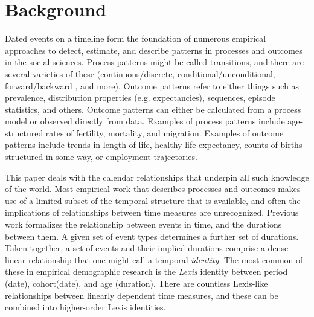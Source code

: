 
\section{Background}
Dated events on a timeline form the foundation of numerous empirical approaches to detect, estimate, and describe patterns in processes and outcomes in the social sciences. Process patterns might be called transitions, and there are several varieties of these (continuous/discrete, conditional/unconditional, forward/backward \citep{brouard2019backward}, and more). Outcome patterns refer to either things such as prevalence, distribution properties (e.g. expectancies), sequences, episode statistics, and others. Outcome patterns can either be calculated from a process model or observed directly from data. Examples of process patterns include age-structured rates of fertility, mortality, and migration. Examples of outcome patterns include trends in length of life, healthy life expectancy, counts of births structured in some way, or employment trajectories. 

This paper deals with the calendar relationships that underpin all such knowledge of the world. Most empirical work that describes processes and outcomes makes use of a limited subset of the temporal structure that is available, and often the implications of relationships between time measures are unrecognized. Previous work \citep{riffe2017demographictime} formalizes the relationship between events in time, and the durations between them. A given set of event types determines a further set of durations. Taken together, a set of events and their implied durations comprise a dense linear relationship that one might call a temporal \emph{identity}. The most common of these in empirical demographic research is the \emph{Lexis} identity between period (date), cohort(date), and age (duration). There are countless Lexis-like relationships between linearly dependent time measures, and these can be combined into higher-order Lexis identities. 

